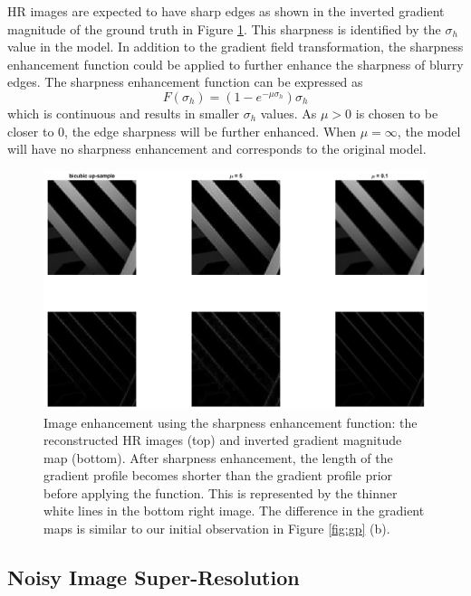 \documentclass[a4paper,11pt]{article}
\begin{document}
HR images are expected to have sharp edges as shown in the inverted gradient magnitude of the ground truth in Figure \ref{fig:mu}. This sharpness is identified by the $\sigma_h$ value in the model. In addition to the gradient field transformation, the sharpness enhancement function could be applied to further enhance the sharpness of blurry edges. The sharpness enhancement function can be expressed as
\begin{equation}
	F(\sigma_h) = (1-e^{-\mu\sigma_h})\sigma_h
\end{equation}
which is continuous and results in smaller $\sigma_h$ values. As $\mu > 0$ is chosen to be closer to 0, the edge sharpness will be further enhanced. When $\mu = \infty$, the model will have no sharpness enhancement and corresponds to the original model.

\begin{figure}[H]
	\centering
	\includegraphics[width=1\textwidth]{mu variation.png}
	\caption{Image enhancement using the sharpness enhancement function: the reconstructed HR images (top) and inverted gradient magnitude map (bottom). After sharpness enhancement, the length of the gradient profile becomes shorter than the gradient profile prior before applying the function. This is represented by the thinner white lines in the bottom right image. The difference in the gradient maps is similar to our initial observation in Figure \ref{fig:gp} (b).}
	\label{fig:mu}
\end{figure}


\subsection{Noisy Image Super-Resolution}
\end{document}
